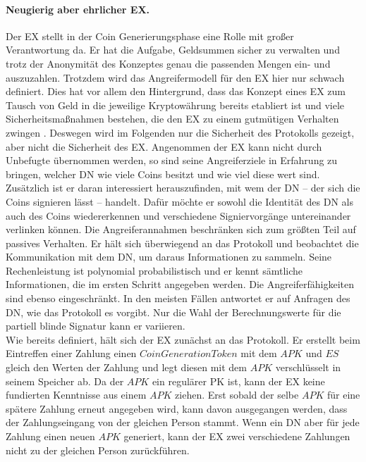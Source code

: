 \documentclass[
	fontsize=11pt,
	headings=small,
	parskip=half,           %
	bibliography=totoc,
	numbers=noenddot,       %
	open=any,               %
]{scrreprt}
\begin{document}
\paragraph{Neugierig aber ehrlicher EX.}
Der EX stellt in der Coin Generierungsphase eine Rolle mit großer Verantwortung da. Er hat die Aufgabe, Geldsummen sicher zu verwalten und trotz der Anonymität des Konzeptes genau die passenden Mengen ein- und auszuzahlen. Trotzdem wird das Angreifermodell für den EX hier nur schwach definiert. Dies hat vor allem den Hintergrund, dass das Konzept eines EX zum Tausch von Geld in die jeweilige Kryptowährung bereits etabliert ist und viele Sicherheitsmaßnahmen bestehen, die den EX zu einem gutmütigen Verhalten zwingen \cite{gnu-burdges2016enabling,kim2018risk,baum2021p2dex}. Deswegen wird im Folgenden nur die Sicherheit des Protokolls gezeigt, aber nicht die Sicherheit des EX.
Angenommen der EX kann nicht durch Unbefugte übernommen werden, so sind seine Angreiferziele in Erfahrung zu bringen, welcher DN wie viele Coins besitzt und wie viel diese wert sind. Zusätzlich ist er daran interessiert herauszufinden, mit wem der DN -- der sich die Coins signieren lässt -- handelt. Dafür möchte er sowohl die Identität des DN als auch des Coins wiedererkennen und verschiedene Signiervorgänge untereinander verlinken können. Die Angreiferannahmen beschränken sich zum größten Teil auf passives Verhalten. Er hält sich überwiegend an das Protokoll und beobachtet die Kommunikation mit dem DN, um daraus Informationen zu sammeln. Seine Rechenleistung ist polynomial probabilistisch und er kennt sämtliche Informationen, die im ersten Schritt angegeben werden. Die Angreiferfähigkeiten sind ebenso eingeschränkt. In den meisten Fällen antwortet er auf Anfragen des DN, wie das Protokoll es vorgibt. Nur die Wahl der Berechnungswerte für die partiell blinde Signatur kann er variieren.\\

Wie bereits definiert, hält sich der EX zunächst an das Protokoll. Er erstellt beim Eintreffen einer Zahlung einen $CoinGenerationToken$ mit dem $APK$ und $ES$ gleich den Werten der Zahlung und legt diesen mit dem $APK$ verschlüsselt in seinem Speicher ab. Da der $APK$ ein regulärer PK ist, kann der EX keine fundierten Kenntnisse aus einem $APK$ ziehen. Erst sobald der selbe $APK$ für eine spätere Zahlung erneut angegeben wird, kann davon ausgegangen werden, dass der Zahlungseingang von der gleichen Person stammt. Wenn ein DN aber für jede Zahlung einen neuen $APK$ generiert, kann der EX zwei verschiedene Zahlungen nicht zu der gleichen Person zurückführen.
\end{document}
